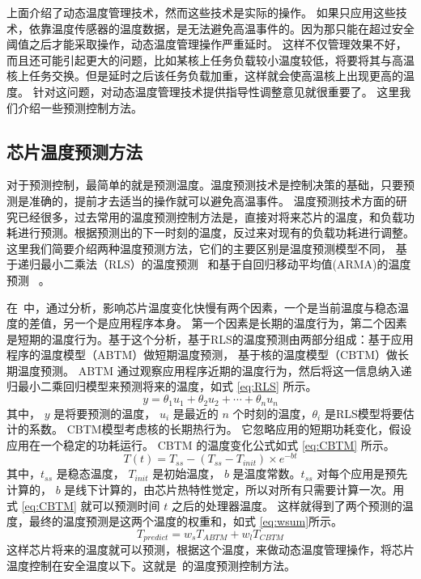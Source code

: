 上面介绍了动态温度管理技术，然而这些技术是实际的操作。
如果只应用这些技术，依靠温度传感器的温度数据，是无法避免高温事件的。因为那只能在超过安全阈值之后才能采取操作，动态温度管理操作严重延时。
这样不仅管理效果不好，而且还可能引起更大的问题，比如某核上任务负载较小温度较低，将要将其与高温核上任务交换。但是延时之后该任务负载加重，这样就会使高温核上出现更高的温度。
针对这问题，对动态温度管理技术提供指导性调整意见就很重要了。
这里我们介绍一些预测控制方法。
\subsection{芯片温度预测方法}\label{sec:temperature}
对于预测控制，最简单的就是预测温度。温度预测技术是控制决策的基础，只要预测是准确的，提前才去适当的操作就可以避免高温事件。
温度预测技术方面的研究已经很多，过去常用的温度预测控制方法是，直接对将来芯片的温度，和负载功耗进行预测。根据预测出的下一时刻的温度，反过来对现有的负载功耗进行调整。
这里我们简要介绍两种温度预测方法，它们的主要区别是温度预测模型不同，
基于递归最小二乘法（RLS）的温度预测~\cite{yeo2008predictive} 和基于自回归移动平均值(ARMA)的温度预测~\cite{coskun2008proactive} 。

在~\cite{yeo2008predictive}中，通过分析，影响芯片温度变化快慢有两个因素，一个是当前温度与稳态温度的差值，另一个是应用程序本身。
第一个因素是长期的温度行为，第二个因素是短期的温度行为。基于这个分析，基于RLS的温度预测由两部分组成：基于应用程序的温度模型（ABTM）做短期温度预测，
基于核的温度模型（CBTM）做长期温度预测。 ABTM 通过观察应用程序近期的温度行为，然后将这一信息纳入递归最小二乘回归模型来预测将来的温度，如式 \eqref{eq:RLS} 所示。
\begin{equation}\label{eq:RLS}
y = \theta_1u_1 + \theta_2u_2 + \cdots + \theta_nu_n
\end{equation}
其中， $y$ 是将要预测的温度， $u_i$ 是最近的 $n$ 个时刻的温度，$\theta_i$ 是RLS模型将要估计的系数。 CBTM模型考虑核的长期热行为。
它忽略应用的短期功耗变化，假设应用在一个稳定的功耗运行。 CBTM 的温度变化公式如式 \eqref{eq:CBTM} 所示。
\begin{equation}\label{eq:CBTM}
T(t) = T_{ss} -(T_{ss} - T_{init}) \times e^{-bt}
\end{equation}
其中，$t_{ss}$ 是稳态温度， $T_{init}$ 是初始温度， $b$ 是温度常数。$t_{ss}$ 对每个应用是预先计算的，  
$b$ 是线下计算的，由芯片热特性觉定，所以对所有只需要计算一次。用式 \eqref{eq:CBTM} 就可以预测时间 $t$ 之后的处理器温度。
这样就得到了两个预测的温度，最终的温度预测是这两个温度的权重和，如式 \eqref{eq:wsum}所示。
\begin{equation}\label{eq:wsum}
T_{predict} = w_sT_{ABTM} + w_lT_{CBTM}
\end{equation}
这样芯片将来的温度就可以预测，根据这个温度，来做动态温度管理操作，将芯片温度控制在安全温度以下。这就是~\cite{yeo2008predictive}的温度预测控制方法。

